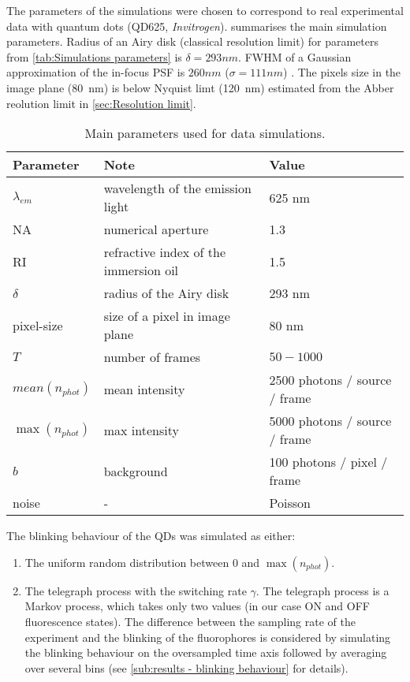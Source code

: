 The parameters of the simulations were chosen to correspond to real experimental data with quantum dots (QD625, \emph{Invitrogen}).   summarises the main simulation parameters. Radius of an Airy disk (classical resolution limit) for parameters from \autoref{tab:Simulations parameters} is $\delta=293 \unit{nm}$. FWHM of a Gaussian approximation of the in-focus PSF is $260\unit{nm}$ ($\sigma = 111\unit{nm}$) \cite{Zhang2007}. The pixels size in the image plane (80~nm) is below Nyquist limt (120~nm) estimated from the Abber reolution limit in \autoref{sec:Resolution limit}.
%
\begin{table}[!h]	
	\centering
	\begin{tabular}{|l|l|l|}		
		\hline \small
		\bf Parameter 		& \bf Note  			& \bf Value\tabularnewline
		\hline %
		$\lambda_{em}$ 	& wavelength of the emission light 	& 625 nm\tabularnewline
		NA 				& numerical aperture 	& 1.3\tabularnewline
		RI 				& refractive index of the immersion oil	& 1.5\tabularnewline
		$\delta$ 			& radius of the Airy disk 	& 293 nm\tabularnewline		
		pixel-size 			& size of a pixel in image plane	& 80 nm\tabularnewline
		$T$ 				& number of frames  		& $50-1000$\tabularnewline
		$\unit{mean}(n_{phot})$ & mean intensity  		& 2500 photons / source / frame\tabularnewline
		$\max(n_{phot})$ 	& max intensity	 		& 5000 photons / source / frame\tabularnewline
		$b$ 				& background 			& 100 photons / pixel / frame\tabularnewline
		noise			& -					& Poisson\tabularnewline
		\hline
	\end{tabular}
	\caption{Main parameters used for data simulations.}
	\label{tab:Simulations parameters}
\end{table}

The blinking behaviour of the QDs was simulated as either:
%
\begin{enumerate}
	\item
	The uniform random distribution between $0$ and $\max(n_{phot})$.
	\item
	The telegraph process with the switching rate $\gamma$. The telegraph process is a Markov process, which takes only two values (in our case ON and OFF fluorescence states). The difference between the sampling rate of the experiment and the blinking of the fluorophores is considered by simulating the blinking behaviour on the oversampled time axis followed by averaging over several bins (see \autoref{sub:results - blinking behaviour} for details). 
\end{enumerate}
 
